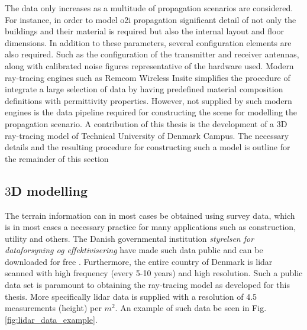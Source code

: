 The data only increases as a multitude of propagation scenarios are considered. For instance, in order to model \gls{o2i} propagation significant detail of not only the buildings and their material is required but also the internal layout and floor dimensions. In addition to these parameters, several configuration elements are also required. Such as the configuration of the transmitter and receiver antennas, along with calibrated noise figures representative of the hardware used. Modern ray-tracing engines such as Remcom Wireless Insite \cite{remcom} simplifies the procedure of integrate a large selection of data by having predefined material composition definitions with permittivity properties. However, not supplied by such modern engines is the data pipeline required for constructing the scene for modelling the propagation scenario. A contribution of this thesis is the development of a $3$D ray-tracing model of Technical University of Denmark Campus. The necessary details and the resulting procedure for constructing such a model is outline for the remainder of this section

\subsection{$3$D modelling}

The terrain information can in most cases be obtained using survey data, which is in most cases a necessary practice for many applications such as construction, utility and others. The Danish governmental institution \emph{styrelsen for dataforsyning og effektivisering} have made such data public and can be downloaded for free \cite{kortforsyningen}. Furthermore, the entire country of Denmark is \gls{lidar} scanned with high frequency (every 5-10 years) and high resolution. Such a public data set is paramount to obtaining the ray-tracing model as developed for this thesis. More specifically \gls{lidar} data is supplied with a resolution of 4.5 measurements (height) per $m^2$. An example of such data be seen in Fig. \ref{fig:lidar_data_example}. 

